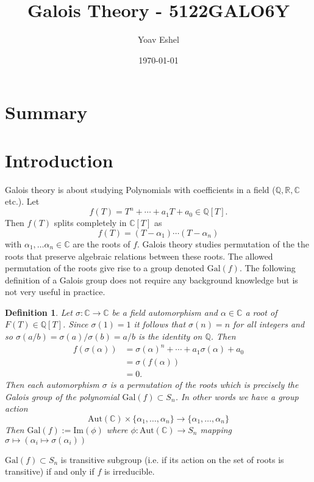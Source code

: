 \documentclass{article}
\title{Galois Theory - 5122GALO6Y}
\author{Yoav Eshel}
\date{\today}
\newcommand{\R}{\mathbb{R}}
\newcommand{\Cc}{\mathbb{C}}
\newcommand{\Q}{\mathbb{Q}}
\newtheorem*{definition}{Definition}
\theoremstyle{remark}
\begin{document}
    \maketitle
    \tableofcontents
    \newpage
    \section{Summary}
    \section{Introduction}
    Galois theory is about studying Polynomials with coefficients in a field ($\Q,\R,\Cc$ etc.).
    Let
    $$
        f(T) = T^n+\cdots+a_1T+a_0\in\Q[T].
    $$
    Then $f(T)$ splits completely in $\Cc[T]$ as
    $$
        f(T)=(T-\alpha_1)\cdots(T-\alpha_n)
    $$
    with $\alpha_1,\dots \alpha_n\in\Cc$ are the roots of $f$. Galois theory studies permutation of the the roots that preserve algebraic relations between these roots.
    The allowed permutation of the roots give rise to a group denoted $\text{Gal}(f)$.
    The following definition of a Galois group does not require any background knowledge but is not very useful in practice.

    \begin{definition}
        Let $\sigma:\Cc\to\Cc$ be a field automorphism and $\alpha\in\Cc$ a root of $F(T)\in\Q[T]$. Since $\sigma(1)=1$ it follows that $\sigma(n)=n$ for all integers and so $\sigma(a/b)=\sigma(a)/\sigma(b)=a/b$ is the identity on $\Q$.
        Then
        \begin{align*}
            f(\sigma(\alpha))&=\sigma(\alpha)^n+\cdots+a_1\sigma(\alpha)+a_0\\
            &=\sigma(f(\alpha))\\
            &=0.
        \end{align*}
        Then each automorphism $\sigma$ is a permutation of the roots which is precisely the Galois group of the polynomial $\text{Gal}(f)\subset S_n$.
        In other words we have a group action 
        $$
        \text{Aut}(\Cc)\times\{\alpha_1,\dots,\alpha_n\}\to\{\alpha_1,\dots,\alpha_n\}
        $$
        Then $\text{Gal}(f):=\text{Im}(\phi)$ where $\phi:\text{Aut}(\Cc)\to S_n$ mapping $\sigma\mapsto(\alpha_i\mapsto \sigma(\alpha_i))$
    \end{definition}

    $\text{Gal}(f)\subset S_n$ is transitive subgroup (i.e. if its action on the set of roots is transitive) if and only if $f$ is irreducible.
    
\end{document}
